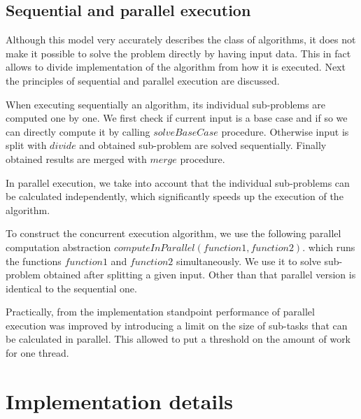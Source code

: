 \documentclass[a4paper,english,numberwithinsect,notab]{eurocg20-submission}
\begin{document}


	
	
\subsection{Sequential and parallel execution}
	
	
	Although this model very accurately describes the class of algorithms, it does not make it possible to solve the problem directly by having input data. This in fact allows to divide implementation of the algorithm from how it is executed. Next the principles of sequential and parallel execution are discussed.
	
	When executing sequentially an algorithm, its individual sub-problems are computed one by one. We first check if current input is a base case and if so we can directly compute it by calling $solveBaseCase$ procedure. Otherwise input is split with $divide$ and obtained sub-problem are solved sequentially. Finally obtained results are merged with $merge$ procedure.
	
	In parallel execution, we take into account that the individual sub-problems can be calculated independently, which significantly speeds up the execution of the algorithm.
	
	To construct the concurrent execution algorithm, we use the following parallel computation abstraction $computeInParallel(function1, function2)$. which runs the functions $function1$ and $function2$ simultaneously. We use it to solve sub-problem obtained after splitting a given input. Other than that parallel version is identical to the sequential one.
	
	Practically, from the implementation standpoint performance of parallel execution was improved by introducing a limit on the size of sub-tasks that can be calculated in parallel. This allowed to put a threshold on the amount of work for one thread.


\section{Implementation details}
\label{sec:implementation-details}
\end{document}
